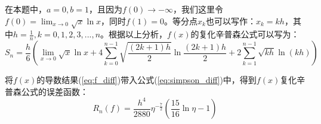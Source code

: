 在本题中，$a=0,b=1$，且因为$f(0) \rightarrow -\infty$，我们这里令$f(0) = \lim_{x \rightarrow 0} \sqrt{x} \ln x$，同时$f(1) = 0$。等分点$x_k$也可以写作：$x_k = kh$，其中$h = \frac{1}{n},k=0,1,2,3,...,n$。根据以上分析，$f(x)$的复化辛普森公式可以写为：
\begin{equation}
    S_n = \frac{h}{6} \left(\lim_{x\rightarrow 0} \sqrt{x} \ln x + 4 \sum_{k=0}^{n-1} \sqrt{\frac{(2k+1)h}{2}} \ln \frac{(2k+1)h}{2} + 2\sum_{k=1}^{n-1} \sqrt{kh} \ln (kh)\right)
    \label{eq:compound_simpson_f}
\end{equation}

将$f(x)$的导数结果(\ref{eq:f_diff})带入公式(\ref{eq:simpson_diff})中，得到$f(x)$复化辛普森公式的误差函数：
\begin{equation}
    R_n(f) = \frac{h^4}{2880} \eta^{-\frac{7}{2}} (\frac{15}{16} \ln \eta - 1)
    \label{eq:compound_simpson_R_f}
\end{equation}

